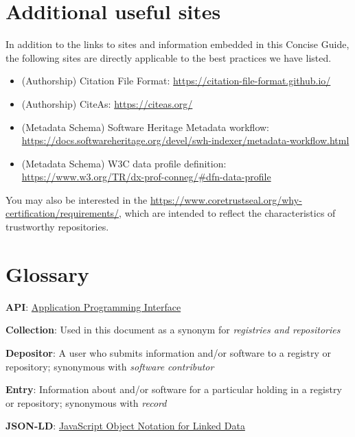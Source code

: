 \documentclass[11pt]{article}
\begin{document}
\section{Additional useful sites }
\label{additional-useful-sites}

In addition to the links to sites and information embedded in this Concise Guide, the following sites are directly applicable to the best practices we have listed.

\begin{itemize}

\item (Authorship) Citation File Format: \url{https://citation-file-format.github.io/}

\item (Authorship) CiteAs: \url{https://citeas.org/}

\item (Metadata Schema) Software Heritage Metadata workflow: \url{https://docs.softwareheritage.org/devel/swh-indexer/metadata-workflow.html}

\item (Metadata Schema) W3C data profile definition: \url{https://www.w3.org/TR/dx-prof-conneg/\#dfn-data-profile}

\end{itemize}

You may also be interested in the \url{https://www.coretrustseal.org/why-certification/requirements/}, which are intended to reflect the characteristics of trustworthy repositories.


\section{Glossary}
\label{glossary}

\textbf{API}: \href{https://en.wikipedia.org/wiki/API}{Application Programming Interface}

\textbf{Collection}: Used in this document as a synonym for \emph{registries and repositories}

\textbf{Depositor}: A user who submits information and/or software to a registry or repository; synonymous with \emph{software contributor}

\textbf{Entry}: Information about and/or software for a particular holding in a registry or repository; synonymous with \emph{record}

\textbf{JSON-LD}: \href{https://en.wikipedia.org/wiki/JSON-LD}{JavaScript Object Notation for Linked Data}
\end{document}
